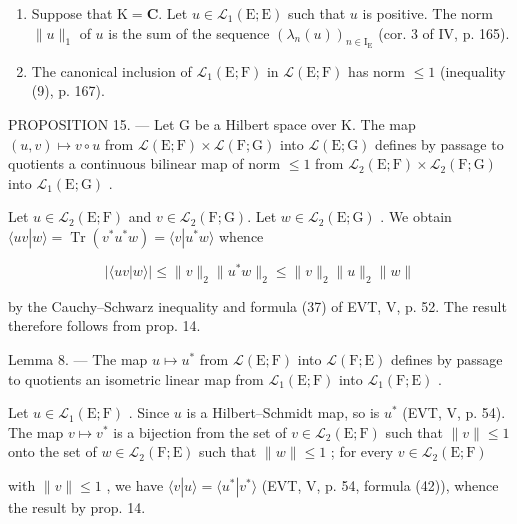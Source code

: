 \begin{enumerate}
\def\labelenumi{\arabic{enumi})}
\setcounter{enumi}{2}
\item
  Suppose that \(\mathrm{K} = \mathbf{C}\). Let \(u \in \mathcal{L}_1(\mathrm{E};\mathrm{E})\) such that \(u\) is positive. The norm \(\| u\| _1\) of \(u\) is the sum of the sequence \((\lambda_n(u))_{n\in \mathrm{I_E}}\) (cor. 3 of IV, p. 165).
\item
  The canonical inclusion of \(\mathcal{L}_1(\mathrm{E};\mathrm{F})\) in \(\mathcal{L}(\mathrm{E};\mathrm{F})\) has norm \(\leqslant 1\) (inequality (9), p. 167).
\end{enumerate}

PROPOSITION 15. --- Let G be a Hilbert space over K. The map \((u,v)\mapsto v\circ u\) from \(\mathcal{L}(\mathrm{E};\mathrm{F})\times\mathcal{L}(\mathrm{F};\mathrm{G})\) into \(\mathcal{L}(\mathrm{E};\mathrm{G})\) defines by passage to quotients a continuous bilinear map of norm \(\leqslant1\) from \(\mathcal{L}_{2}(\mathrm{E};\mathrm{F})\times\mathcal{L}_{2}(\mathrm{F};\mathrm{G})\) into \(\mathcal{L}_{1}(\mathrm{E};\mathrm{G})\) .

Let \(u \in \mathcal{L}_2(\mathrm{E};\mathrm{F})\) and \(v \in \mathcal{L}_2(\mathrm{F};\mathrm{G})\). Let \(w \in \mathcal{L}_2(\mathrm{E};\mathrm{G})\) . We obtain \(\langle uv | w \rangle = \operatorname{Tr}(v^* u^* w) = \langle v | u^* w \rangle\) whence

\[
| \langle u v | w \rangle | \leqslant \| v \| _ {2} \| u ^ {*} w \| _ {2} \leqslant \| v \| _ {2} \| u \| _ {2} \| w \|
\]

by the Cauchy--Schwarz inequality and formula (37) of EVT, V, p. 52. The result therefore follows from prop. 14.

Lemma 8. --- The map \(u \mapsto u^{*}\) from \(\mathcal{L}(\mathrm{E};\mathrm{F})\) into \(\mathcal{L}(\mathrm{F};\mathrm{E})\) defines by passage to quotients an isometric linear map from \(\mathcal{L}_{1}(\mathrm{E};\mathrm{F})\) into \(\mathcal{L}_{1}(\mathrm{F};\mathrm{E})\) .

Let \(u \in \mathcal{L}_1(\mathrm{E};\mathrm{F})\) . Since \(u\) is a Hilbert--Schmidt map, so is \(u^*\) (EVT, V, p. 54). The map \(v \mapsto v^*\) is a bijection from the set of \(v \in \mathcal{L}_2(\mathrm{E};\mathrm{F})\) such that \(\|v\| \leqslant 1\) onto the set of \(w \in \mathcal{L}_2(\mathrm{F};\mathrm{E})\) such that \(\|w\| \leqslant 1\) ; for every \(v \in \mathcal{L}_2(\mathrm{E};\mathrm{F})\)

with \(\|v\|\leqslant1\) , we have \(\langle v|u\rangle=\langle u^{*}|v^{*}\rangle\) (EVT, V, p. 54, formula (42)), whence the result by prop. 14.

